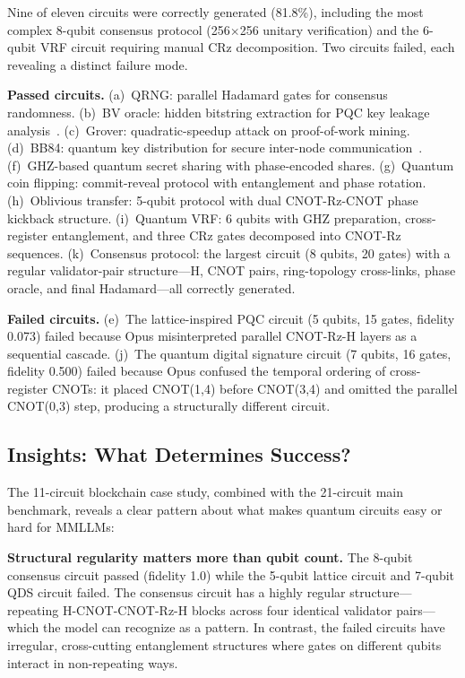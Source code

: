 \documentclass[conference]{IEEEtran}
\begin{document}
Nine of eleven circuits were correctly generated (81.8\%), including the most complex 8-qubit consensus protocol (256$\times$256 unitary verification) and the 6-qubit VRF circuit requiring manual CRz decomposition. Two circuits failed, each revealing a distinct failure mode.

\textbf{Passed circuits.} (a)~QRNG: parallel Hadamard gates for consensus randomness. (b)~BV oracle: hidden bitstring extraction for PQC key leakage analysis~\cite{fedorov2018quantum}. (c)~Grover: quadratic-speedup attack on proof-of-work mining. (d)~BB84: quantum key distribution for secure inter-node communication~\cite{liu2026quantumsafe}. (f)~GHZ-based quantum secret sharing with phase-encoded shares. (g)~Quantum coin flipping: commit-reveal protocol with entanglement and phase rotation. (h)~Oblivious transfer: 5-qubit protocol with dual CNOT-Rz-CNOT phase kickback structure. (i)~Quantum VRF: 6 qubits with GHZ preparation, cross-register entanglement, and three CRz gates decomposed into CNOT-Rz sequences. (k)~Consensus protocol: the largest circuit (8 qubits, 20 gates) with a regular validator-pair structure---H, CNOT pairs, ring-topology cross-links, phase oracle, and final Hadamard---all correctly generated.

\textbf{Failed circuits.} (e)~The lattice-inspired PQC circuit (5 qubits, 15 gates, fidelity 0.073) failed because Opus misinterpreted parallel CNOT-Rz-H layers as a sequential cascade. (j)~The quantum digital signature circuit (7 qubits, 16 gates, fidelity 0.500) failed because Opus confused the temporal ordering of cross-register CNOTs: it placed CNOT(1,4) before CNOT(3,4) and omitted the parallel CNOT(0,3) step, producing a structurally different circuit.

\subsection{Insights: What Determines Success?}

The 11-circuit blockchain case study, combined with the 21-circuit main benchmark, reveals a clear pattern about what makes quantum circuits easy or hard for MMLLMs:

\textbf{Structural regularity matters more than qubit count.} The 8-qubit consensus circuit passed (fidelity 1.0) while the 5-qubit lattice circuit and 7-qubit QDS circuit failed. The consensus circuit has a highly regular structure---repeating H-CNOT-CNOT-Rz-H blocks across four identical validator pairs---which the model can recognize as a pattern. In contrast, the failed circuits have irregular, cross-cutting entanglement structures where gates on different qubits interact in non-repeating ways.
\end{document}

